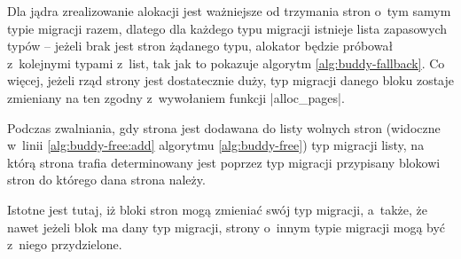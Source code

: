 Dla jądra zrealizowanie alokacji jest ważniejsze od trzymania stron
o~tym samym typie migracji razem, dlatego dla każdego typu migracji
istnieje lista zapasowych typów -- jeżeli brak jest stron żądanego
typu, alokator będzie próbował z~kolejnymi typami z~list, tak jak to
pokazuje algorytm \ref{alg:buddy-fallback}.  Co więcej, jeżeli rząd
strony jest dostatecznie duży, typ migracji danego bloku zostaje
zmieniany na ten zgodny z~wywołaniem funkcji \code|alloc_pages|.

Podczas zwalniania, gdy strona jest dodawana do listy wolnych stron
(widoczne w~linii \ref{alg:buddy-free:add} algorytmu
\ref{alg:buddy-free}) typ migracji listy, na którą strona trafia
determinowany jest poprzez typ migracji przypisany blokowi stron do
którego dana strona należy.

Istotne jest tutaj, iż bloki stron mogą zmieniać swój typ migracji,
a~także, że nawet jeżeli blok ma dany typ migracji, strony o~innym
typie migracji mogą być z~niego przydzielone.
